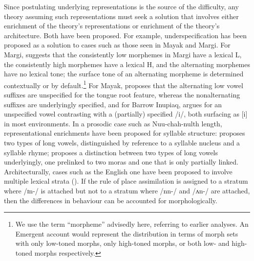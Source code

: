 Since postulating underlying representations is the source of the difficulty, any theory assuming such representations must seek a solution that involves either enrichment of the theory's representations or enrichment of the theory's architecture. Both have been proposed. For example, underspecification has been proposed as a solution to cases such as those seen in Mayak and Margi. For Margi, \citet{Pulleyblank:1986} suggests that the consistently low morphemes in Margi have a lexical L, the consistently high morphemes have a lexical H, and the alternating morphemes have no lexical tone; the surface tone of an alternating morpheme is determined contextually or by default.\footnote{We use the term ``morpheme'' advisedly here, referring to earlier analyses. An Emergent account would represent the distribution in terms of morph sets with only low-toned morphs, only high-toned morphs, or both low- and high-toned morphs respectively.} For Mayak, \citet{Andersen:1999-Vs} proposes that the alternating low vowel suffixes  are unspecified for the tongue root feature, whereas the nonalternating suffixes are underlyingly specified, and for Barrow Inupiaq, \citet{Archangeli+:1994} argues for an unspecified vowel contrasting with a (partially) specified /i/, both surfacing as [i] in most environments. In a prosodic case such as Nuu-chah-nulth length, representational enrichments have been proposed for syllable structure: \citet{Stonham:1990} proposes two types of long vowels, distinguished by reference to a syllable nucleus and a syllable rhyme; \citet{Kim:2003} proposes a distinction between two types of long vowels underlyingly, one prelinked to two moras and one that is only partially linked. Architecturally, cases such as the English one have been proposed to involve multiple lexical strata (\citealt{Kiparsky:1982lexical-phonology, Mohanan:1986}). If the rule of place assimilation is assigned to a stratum where /ɪn-/ is attached but not to a stratum where /nn-/ and /ʌn-/ are attached, then the differences in behaviour can be accounted for morphologically.

